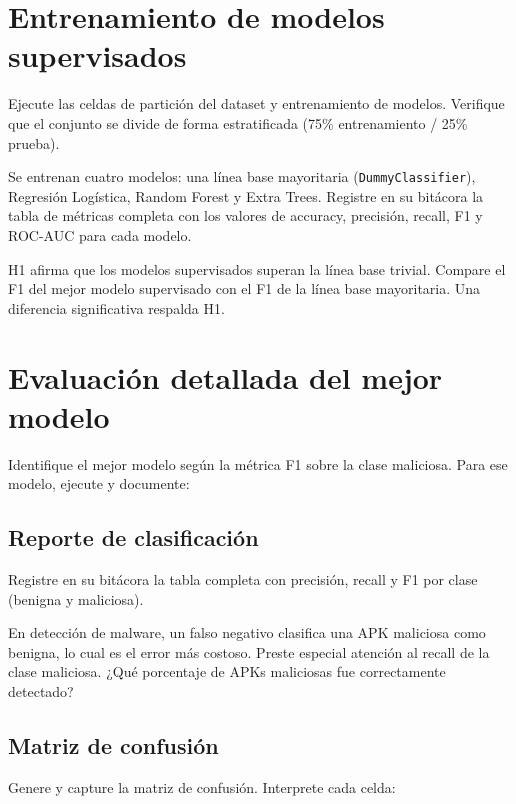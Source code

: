 \documentclass[
  coursetitle={Cómputo Nube y Tecnologías Emergentes},
  coursehours={96},
  coursedate={Verano 2026},
  doctype={Taller},
  otherlangs={english,french},
  authorname={Lázaro},
  authorsurname={Bustio-Martínez},
  authortitle={PhD},
  role={Profesor Investigador},
  email={lbustio@inaoe.mx},
  phone={5559504000},
  ext={7459},
  institution={Instituto Nacional de Astrofísica, Óptica y Electrónica (INAOE)},
  department={Maestría en Ciencias en Tecnologías de Seguridad},
  address={Luis Enrique Erro 1, Sta. Ma. Tonantzintla, San Andrés Cholula, CP 72840, Puebla, México},
  margin={0.5in}
]{../../lbustio_lecture_notes}
\begin{document}
\section{Entrenamiento de modelos supervisados}

Ejecute las celdas de partición del dataset y entrenamiento de modelos. Verifique que el conjunto se divide de forma estratificada (75\% entrenamiento / 25\% prueba).

Se entrenan cuatro modelos: una línea base mayoritaria (\texttt{DummyClassifier}), Regresión Logística, Random Forest y Extra Trees. Registre en su bitácora la tabla de métricas completa con los valores de accuracy, precisión, recall, F1 y ROC-AUC para cada modelo.

\begin{tcolorbox}[title=Evidencia para H1]
H1 afirma que los modelos supervisados superan la línea base trivial. Compare el F1 del mejor modelo supervisado con el F1 de la línea base mayoritaria. Una diferencia significativa respalda H1.
\end{tcolorbox}

\section{Evaluación detallada del mejor modelo}

Identifique el mejor modelo según la métrica F1 sobre la clase maliciosa. Para ese modelo, ejecute y documente:

\subsection{Reporte de clasificación}

Registre en su bitácora la tabla completa con precisión, recall y F1 por clase (benigna y maliciosa).

\begin{tcolorbox}[title=Falsos negativos en seguridad]
En detección de malware, un falso negativo clasifica una APK maliciosa como benigna, lo cual es el error más costoso. Preste especial atención al recall de la clase maliciosa. ¿Qué porcentaje de APKs maliciosas fue correctamente detectado?
\end{tcolorbox}

\subsection{Matriz de confusión}

Genere y capture la matriz de confusión. Interprete cada celda:
\end{document}
